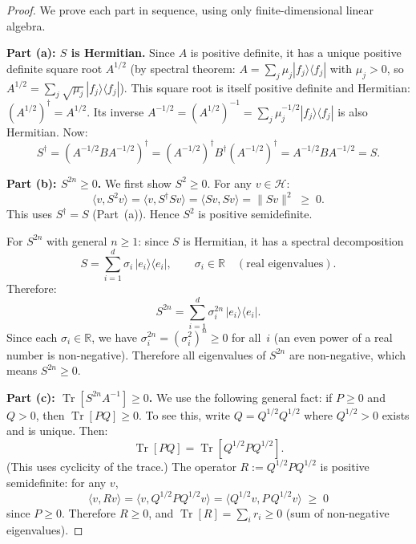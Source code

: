 \documentclass[12pt,a4paper]{article}
\theoremstyle{plain}
\theoremstyle{definition}
\theoremstyle{remark}
\begin{document}
\begin{proof}
We prove each part in sequence, using only finite-dimensional linear algebra.

\textbf{Part (a): $S$ is Hermitian.} Since $A$ is positive definite, it has a unique positive definite square root $A^{1/2}$ (by spectral theorem: $A=\sum_j\mu_j|f_j\rangle\langle f_j|$ with $\mu_j>0$, so $A^{1/2}=\sum_j\sqrt{\mu_j}\,|f_j\rangle\langle f_j|$). This square root is itself positive definite and Hermitian: $(A^{1/2})^\dagger=A^{1/2}$. Its inverse $A^{-1/2}=(A^{1/2})^{-1}=\sum_j\mu_j^{-1/2}|f_j\rangle\langle f_j|$ is also Hermitian. Now:
\begin{equation}
S^\dagger = (A^{-1/2}BA^{-1/2})^\dagger = (A^{-1/2})^\dagger B^\dagger (A^{-1/2})^\dagger = A^{-1/2}BA^{-1/2} = S.
\end{equation}

\textbf{Part (b): $S^{2n}\geq 0$.} We first show $S^2\geq 0$. For any $v\in\mathcal{H}$:
\begin{equation}\label{eq:S2psd}
\langle v, S^2 v\rangle = \langle v, S^\dagger S v\rangle = \langle Sv, Sv\rangle = \|Sv\|^2 \;\geq\; 0.
\end{equation}
This uses $S^\dagger=S$ (Part~(a)). Hence $S^2$ is positive semidefinite.

For $S^{2n}$ with general $n\geq 1$: since $S$ is Hermitian, it has a spectral decomposition
\begin{equation}\label{eq:Sspectral}
S = \sum_{i=1}^d \sigma_i\,|e_i\rangle\langle e_i|, \qquad \sigma_i\in\mathbb{R}\quad(\text{real eigenvalues}).
\end{equation}
Therefore:
\begin{equation}\label{eq:S2n}
S^{2n} = \sum_{i=1}^d \sigma_i^{2n}\,|e_i\rangle\langle e_i|.
\end{equation}
Since each $\sigma_i\in\mathbb{R}$, we have $\sigma_i^{2n}=(\sigma_i^2)^n\geq 0$ for all~$i$ (an even power of a real number is non-negative). Therefore all eigenvalues of $S^{2n}$ are non-negative, which means $S^{2n}\geq 0$.

\textbf{Part (c): $\operatorname{Tr}[S^{2n}A^{-1}]\geq 0$.} We use the following general fact: if $P\geq 0$ and $Q>0$, then $\operatorname{Tr}[PQ]\geq 0$. To see this, write $Q=Q^{1/2}Q^{1/2}$ where $Q^{1/2}>0$ exists and is unique. Then:
\begin{equation}\label{eq:TrPQ}
\operatorname{Tr}[PQ] = \operatorname{Tr}[Q^{1/2}PQ^{1/2}].
\end{equation}
(This uses cyclicity of the trace.) The operator $R:=Q^{1/2}PQ^{1/2}$ is positive semidefinite: for any $v$,
\begin{equation}
\langle v, Rv\rangle = \langle v, Q^{1/2}PQ^{1/2}v\rangle = \langle Q^{1/2}v, P\,Q^{1/2}v\rangle \;\geq\; 0
\end{equation}
since $P\geq 0$. Therefore $R\geq 0$, and $\operatorname{Tr}[R]=\sum_i r_i\geq 0$ (sum of non-negative eigenvalues).


\end{proof}
\end{document}
